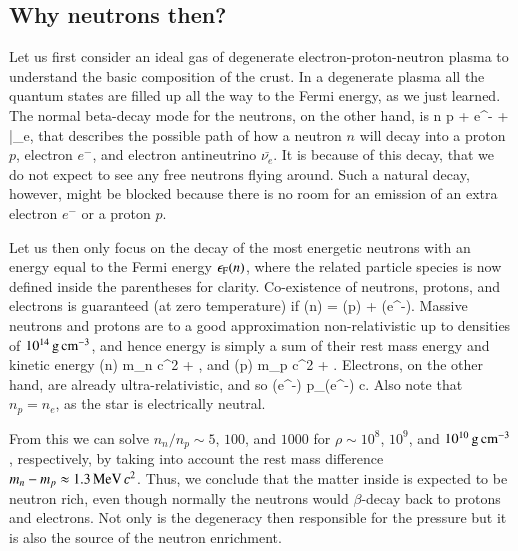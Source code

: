 \subsection{Why neutrons then?}

Let us first consider an ideal gas of degenerate electron-proton-neutron plasma to understand the basic composition of the crust.\cite[see e.g.,][]{Phillips94}
In a degenerate plasma all the quantum states are filled up all the way to the Fermi energy, as we just learned.
The normal beta-decay mode for the neutrons, on the other hand, is 
\be
n \rightarrow p + e^{-} + \bar{\nu_{e}},
\ee
that describes the possible path of how a neutron $n$ will decay into a proton $p$, electron $e^{-}$, and electron antineutrino $\bar{\nu_{e}}$.
It is because of this decay, that we do not expect to see any free neutrons flying around.
Such a natural decay, however, might be blocked because there is no room for an emission of an extra electron $e^{-}$ or a proton $p$.

Let us then only focus on the decay of the most energetic neutrons with an energy equal to the Fermi energy $\epsilon_{\mathrm{F}} (n)$, where the related particle species is now defined inside the parentheses for clarity.
Co-existence of neutrons, protons, and electrons is guaranteed (at zero temperature) if 
\be
\ef(n) = \ef(p) + \ef(e^{-}).
\ee
Massive neutrons and protons are to a good approximation non-relativistic up to densities of $10^{14}\, \mathrm{g}\,\mathrm{cm}^{-3}$, and hence energy is simply a sum of their rest mass energy and kinetic energy
\be
\ef(n) \approx m_n c^2 + ,
\ee
and
\be
\ef(p) \approx m_p c^2 + .
\ee
Electrons, on the other hand, are already ultra-relativistic, and so
\be
\ef(e^{-}) \approx p_{}(e^{-}) c.
\ee
Also note that $n_p = n_e$, as the star is electrically neutral.

From this we can solve $n_n/n_p \sim 5$, $100$, and $1000$ for $\rho \sim 10^8$, $10^9$, and $10^{10} \, \mathrm{g}\,\mathrm{cm}^{-3}$, respectively, by taking into account the rest mass difference $m_n - m_p \approx 1.3 \,\mathrm{MeV}\, c^2$.
Thus, we conclude that the matter inside is expected to be neutron rich, even though normally the neutrons would $\beta$-decay back to protons and electrons.
Not only is the degeneracy then responsible for the pressure but it is also the source of the neutron enrichment. 



